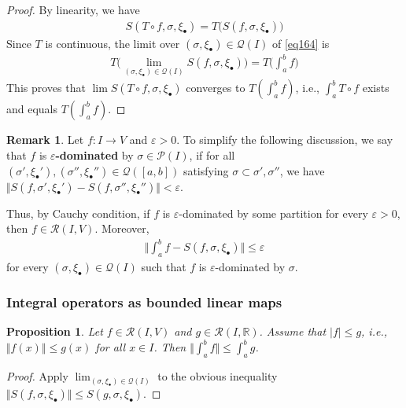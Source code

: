 \documentclass[12pt,b5paper,notitlepage]{article}
\theoremstyle{definition}
\newtheorem{rem}[df]{Remark}
\theoremstyle{plain}
\newtheorem{pp}[df]{Proposition}
\newcommand{\mc}{\mathcal}
\newcommand{\scr}{\mathscr}
\newcommand{\blt}{\bullet}
\newcommand{\Rbb}{\mathbb R}
\newcommand{\dps}{\displaystyle}
\newcommand{\eps}{\varepsilon}
\numberwithin{equation}{section}
\begin{document}
\begin{proof}
By linearity, we have
\begin{align}
S(T\circ f,\sigma,\xi_\blt)=T\big(S(f,\sigma,\xi_\blt) \big)  \label{eq164}
\end{align}
Since $T$ is continuous, the limit over $(\sigma,\xi_\blt) \in \mc Q(I)$ of \eqref{eq164} is
\begin{align*}
T\Big(\lim_{(\sigma,\xi_\blt)\in\mc Q(I)}S(f,\sigma,\xi_\blt)\Big)=T\Big(\int_a^b f \Big)
\end{align*}
This proves that $\lim S(T\circ f,\sigma,\xi_\blt)$ converges to $T(\int_a^bf)$, i.e., $\int_a^b T\circ f$ exists and equals $T(\int_a^bf)$.
\end{proof}




\begin{rem}\label{lb374}
Let $f:I\rightarrow V$ and $\eps>0$. To simplify the following discussion, we say that $f$ is \textbf{$\eps$-dominated} \index{zz@$\eps$-dominated} by $\sigma\in\mc P(I)$, if for all $(\sigma',\xi_\blt'),(\sigma'',\xi_\blt'')\in\mc Q([a,b])$ satisfying $\sigma\subset\sigma',\sigma''$, we have $\Vert S(f,\sigma',\xi_\blt')-S(f,\sigma'',\xi_\blt'')\Vert<\eps$. 

Thus, by Cauchy condition, if $f$ is $\eps$-dominated by some partition for every $\eps>0$, then $f\in\scr R(I,V)$. Moreover,
\begin{align}
\Big\Vert \int_a^b f-S(f,\sigma,\xi_\blt) \Big\Vert\leq\eps
\end{align}
for every $(\sigma,\xi_\blt)\in\mc Q(I)$ such that $f$ is $\eps$-dominated by $\sigma$. \hfill\qedsymbol
\end{rem}





\subsubsection{Integral operators as bounded linear maps}


\begin{pp}\label{lb379}
Let $f\in\scr R(I,V)$ and $g\in\scr R(I,\Rbb)$. Assume that $|f|\leq g$, i.e., $\Vert f(x)\Vert\leq g(x)$ for all $x\in I$. Then $\dps \Big\Vert \int_a^b f \Big\Vert\leq\int_a^b g$.
\end{pp}


\begin{proof}
Apply $\lim_{(\sigma,\xi_\blt)\in\mc Q(I)}$ to the obvious inequality $\Vert S(f,\sigma,\xi_\blt) \Vert\leq S(g,\sigma,\xi_\blt)$.
\end{proof}
\end{document}
